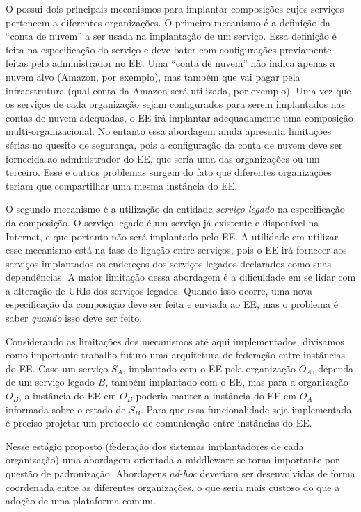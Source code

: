 \begin{description}
O \ee possui dois principais mecanismos para implantar composições cujos serviços
pertencem a diferentes organizações.
O primeiro mecanismo é a definição da ``conta de nuvem'' a ser usada na implantação de um serviço.
Essa definição é feita na especificação do serviço e deve bater com configurações
previamente feitas pelo administrador no EE.
Uma ``conta de nuvem'' não indica apenas a nuvem alvo (Amazon, por exemplo),
mas também que vai pagar pela infraestrutura (qual conta da Amazon será utilizada, por exemplo).
Uma vez que os serviços de cada organização sejam configurados para serem implantados
nas contas de nuvem adequadas, o EE irá implantar adequadamente uma composição
multi-organizacional.
No entanto essa abordagem ainda apresenta limitações sérias no quesito de segurança,
pois a configuração da conta de nuvem deve ser fornecida ao administrador do EE,
que seria uma das organizações ou um terceiro.
Esse e outros problemas surgem do fato que diferentes organizações teriam que
compartilhar uma mesma instância do EE.

O segundo mecanismo é a utilização da entidade \emph{serviço legado} na especificação da composição.
O serviço legado é um serviço já existente e disponível na Internet, e que portanto
não será implantado pelo EE.
A utilidade em utilizar esse mecanismo está na fase de ligação
entre serviços, pois o EE irá fornecer
aos serviços implantados os endereços dos serviços legados declarados como suas dependências.
A maior limitação dessa abordagem é a dificuldade em se lidar com a alteração de URIs
dos serviços legados.
Quando isso ocorre, uma nova especificação da composição deve ser feita e enviada ao EE,
mas o problema é saber \emph{quando} isso deve ser feito.

Considerando as limitações dos mecanismos até aqui implementados,
divisamos como importante trabalho futuro uma arquitetura de federação entre instâncias do EE.
Caso um serviço $S_A$, implantado com o EE pela organização $O_A$, dependa de um serviço legado $B$,
também implantado com o EE, mas para a organização $O_B$, a instância do EE em $O_B$ poderia
manter a instância do EE em $O_A$ informada sobre o estado de $S_B$.
Para que essa funcionalidade seja implementada é preciso projetar um protocolo
de comunicação entre instâncias do EE.

Nesse estágio proposto (federação dos sistemas implantadores de cada organização) uma abordagem
orientada a middleware se torna importante por questão de padronização.
Abordagens \emph{ad-hoc} deveriam ser desenvolvidas de forma coordenada entre as diferentes organizações,
o que seria mais custoso do que a adoção de uma plataforma comum.


\end{description}
